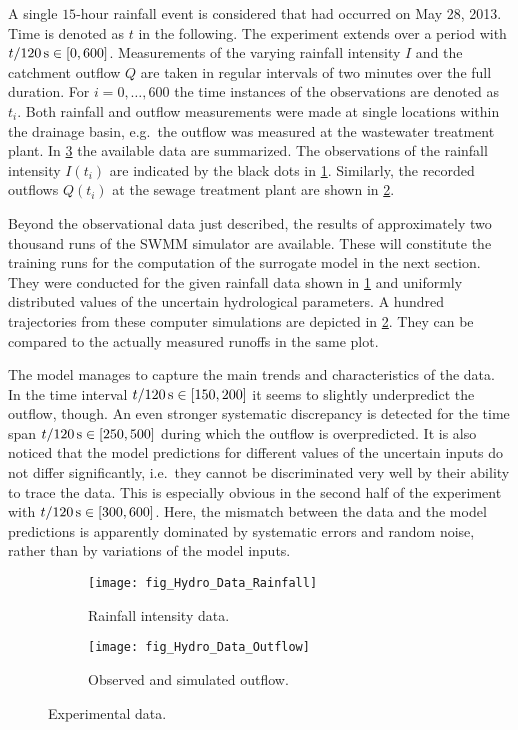 \par %
A single \(15\)-hour rainfall event is considered that had occurred on May 28, 2013.
Time is denoted as \(t\) in the following.
The experiment extends over a period with \(t / \unit[120]{s} \in [0,600]\).
Measurements of the varying rainfall intensity \(I\) and the catchment outflow \(Q\) are taken in regular intervals of two minutes over the full duration.
For \(i=0,\ldots,600\) the time instances of the observations are denoted as \(t_i\).
Both rainfall and outflow measurements were made at single locations within the drainage basin, e.g.\ the outflow was measured at the wastewater treatment plant.
In \cref{fig:Hydro:Data} the available data are summarized.
The observations of the rainfall intensity \(I(t_i)\) are indicated by the black dots in \cref{fig:Hydro:Data:Rainfall}.
Similarly, the recorded outflows \(Q(t_i)\) at the sewage treatment plant are shown in \cref{fig:Hydro:Data:Outflow}.
\par %
Beyond the observational data just described, the results of approximately two thousand runs of the SWMM simulator are available.
These will constitute the training runs for the computation of the surrogate model in the next section.
They were conducted for the given rainfall data shown in \cref{fig:Hydro:Data:Rainfall} and uniformly distributed values of the uncertain hydrological parameters.
A hundred trajectories from these computer simulations are depicted in \cref{fig:Hydro:Data:Outflow}.
They can be compared to the actually measured runoffs in the same plot.
\par %
The model manages to capture the main trends and characteristics of the data.
In the time interval \(t / \unit[120]{s} \in [150,200]\) it seems to slightly underpredict the outflow, though.
An even stronger systematic discrepancy is detected for the time span \(t / \unit[120]{s} \in [250,500]\) during which the outflow is overpredicted.
It is also noticed that the model predictions for different values of the uncertain inputs do not differ significantly,
i.e.\ they cannot be discriminated very well by their ability to trace the data.
This is especially obvious in the second half of the experiment with \(t / \unit[120]{s} \in [300,600]\).
Here, the mismatch between the data and the model predictions is apparently dominated by systematic errors and random noise, rather than by variations of the model inputs.
\begin{figure}[htbp]
  \centering
  \begin{subfigure}[b]{\HYDROsubWidth}
    \centering
    \texttt{[image: fig\_Hydro\_Data\_Rainfall]}
    \caption{Rainfall intensity data.}
    \label{fig:Hydro:Data:Rainfall}
  \end{subfigure}\hfill%
  \begin{subfigure}[b]{\HYDROsubWidth}
    \centering
    \texttt{[image: fig\_Hydro\_Data\_Outflow]}
    \caption{Observed and simulated outflow.}
    \label{fig:Hydro:Data:Outflow}
  \end{subfigure}%
  \caption[Experimental data]{Experimental data.}
  \label{fig:Hydro:Data}
\end{figure}